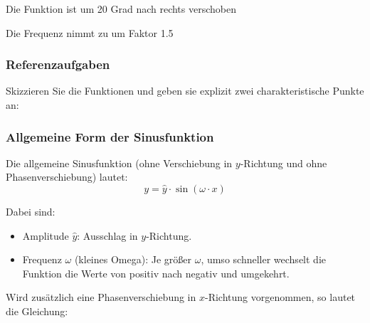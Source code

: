 {{  Die Funktion ist um 20 Grad nach rechts verschoben

  Die Frequenz nimmt zu um Faktor 1.5
}%

\subsubsection{Referenzaufgaben}

Skizzieren Sie die Funktionen und geben sie explizit zwei
charakteristische Punkte an:





\newpage



\subsubsection{Allgemeine Form der Sinusfunktion}

Die allgemeine Sinusfunktion (ohne Verschiebung in $y$-Richtung und
ohne Phasenverschiebung) lautet:
$$y=\widehat{y}\cdot{}\sin(\omega\cdot{}x)$$

Dabei sind:
\begin{itemize}

\item
  Amplitude $\widehat{y}$: Ausschlag in $y$-Richtung.
\item
  Frequenz $\omega$ (kleines Omega): Je größer $\omega$, umso schneller wechselt die
  Funktion die Werte von positiv nach negativ und umgekehrt.
\end{itemize}

Wird zusätzlich eine Phasenverschiebung in $x$-Richtung vorgenommen, so lautet die Gleichung:

}
